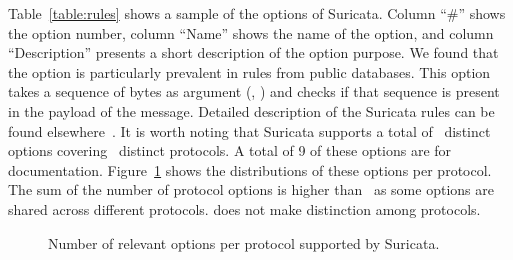 \documentclass[sigconf,review, anonymous]{acmart}
\begin{document}
Table~\ref{table:rules} shows a sample of the options of
Suricata. Column ``\#'' shows the option number, column ``Name'' shows
the name of the option, and column ``Description'' presents a short
description of the option purpose. We found that the option
 is particularly prevalent in rules from public
databases. This
option takes a sequence of bytes as argument (\eg{},
) and checks if that sequence is present
in the payload of the message. Detailed description of the Suricata
rules can be found elsewhere~\cite{suri-rule-format}. It is worth
noting that Suricata supports a total of \totoptions\ distinct options
covering \numproto\ distinct protocols. A total of 9 of these options
are for documentation.
Figure~\ref{fig:distribution-rules-protocol} shows the distributions
of these options per protocol. The sum of the number of protocol
options is higher than \totoptions\ as some options are shared across
different protocols. \tname{} does not make distinction among protocols.


\begin{figure}[t!]
  \centering
  \vspace{-2ex}
  \caption{\label{fig:distribution-rules-protocol}Number of relevant
    options per protocol supported by Suricata.}
\end{figure}
  
\end{document}
